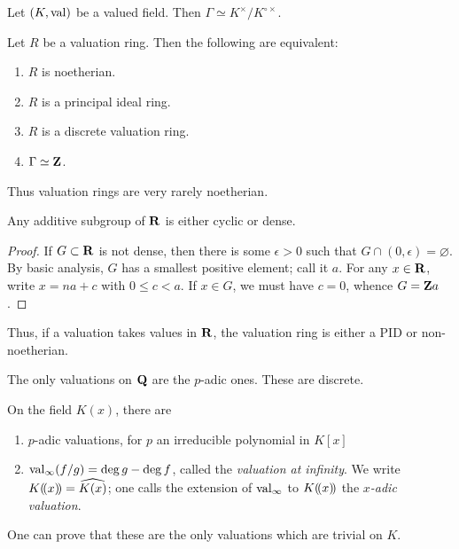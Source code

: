 \begin{corollary}
Let $(K,\operatorname{val})$ be a valued field. Then 
$\Gamma\simeq K^\times/K^{\circ\times}$. 
\end{corollary}

\begin{example}
Let $R$ be a valuation ring. Then the following are equivalent:
\begin{enumerate}
\item
$R$ is noetherian.

\item
$R$ is a principal ideal ring. 

\item
$R$ is a discrete valuation ring.

\item
$\Gamma\simeq \mathbf{Z}$. 
\end{enumerate}
Thus valuation rings are very rarely noetherian. 
\end{example}

\begin{lemma}
Any additive subgroup of $\mathbf{R}$ is either cyclic or dense. 
\end{lemma}
\begin{proof}
If $G\subset \mathbf{R}$ is not dense, then there is some $\epsilon>0$ such that 
$G\cap (0,\epsilon)=\varnothing$. By basic analysis, $G$ has a smallest 
positive element; call it $a$. For any $x\in \mathbf{R}$, write $x=n a+c$ with 
$0\leqslant c<a$. If $x\in G$, we must have $c=0$, whence $G=\mathbf{Z} a$. 
\end{proof}

Thus, if a valuation takes values in $\mathbf{R}$, the valuation ring is either 
a PID or non-noetherian. 

\begin{example}
The only valuations on $\mathbf{Q}$ are the $p$-adic ones. These are discrete. 
\end{example}

\begin{example}
On the field $K(x)$, there are 
\begin{enumerate}
\item
$p$-adic valuations, for $p$ an irreducible polynomial in $K[x]$

\item
$\operatorname{val}_\infty(f/g)=\deg g-\deg f$, called the \emph{valuation at 
infinity}. We write $K(\!( x)\!)=\widehat{K(x)}$; one calls the extension 
of $\operatorname{val}_\infty$ to $K(\!( x)\!)$ the \emph{$x$-adic valuation}. 
\end{enumerate}
One can prove that these are the only valuations which are trivial on $K$. 
\end{example}

